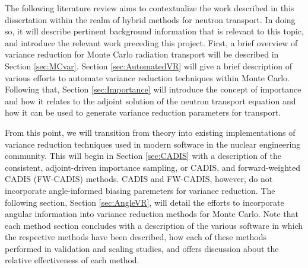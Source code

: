The following literature review aims to contextualize the work described in this dissertation within the realm of hybrid methods for neutron transport. In doing so, it will describe pertinent background information that is relevant to this topic, and introduce the relevant work preceding this project. 
First, a brief overview of variance reduction for Monte Carlo radiation transport will be described in Section \ref{sec:MCvar}.
Section \ref{sec:AutomatedVR} will give a brief description of various efforts to automate variance reduction techniques within Monte Carlo. 
Following that, Section \ref{sec:Importance} will introduce the concept of importance and how it relates to the adjoint solution of the neutron transport equation and how it can be used to generate variance reduction parameters for transport.

From this point, we will transition from theory into existing implementations of variance reduction techniques used in modern software in the nuclear engineering community. This will begin in Section \ref{sec:CADIS} with a description of the consistent, adjoint-driven importance sampling, or CADIS, and forward-weighted CADIS (FW-CADIS) methods.
CADIS and FW-CADIS, however, do not incorporate angle-informed biasing paremeters for variance reduction. 
The following section, Section \ref{sec:AngleVR}, will detail the efforts to incorporate angular information into variance reduction methods for Monte Carlo. 
Note that each method section concludes with a description of the various software in which the respective methods have been described, how each of these methods performed in validation and scaling studies, and offers discussion about the relative effectiveness of each method. 
